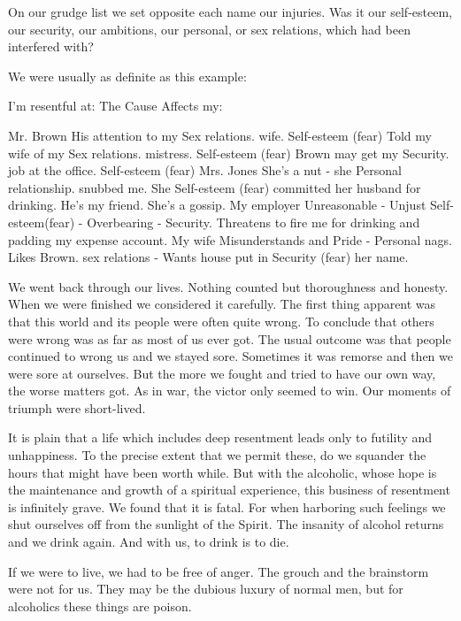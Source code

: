 \begin{biblechapter}
\verse On our grudge list we set opposite each name our injuries.
\verse Was it our 
    self-esteem, 
    our security, 
    our ambitions, 
    our personal, 
    or sex relations, 
    which had been interfered with?

\verse We were usually as definite as this example:

I'm resentful at:            The Cause                                    Affects my:

Mr. Brown 	His attention to my 	Sex relations.
 		wife. 	Self-esteem (fear) 
 	Told my wife of my 	Sex relations.
 		mistress. 	Self-esteem (fear)
 	Brown may get my  	Security.
 		job at the office. 	Self-esteem (fear)
Mrs. Jones 	She's a nut - she 	Personal relationship.
 		snubbed me. She 	Self-esteem (fear)
 		committed her husband 	
 		for drinking.
 		He's my friend.
 		She's a gossip.
My employer 	Unreasonable - Unjust 	Self-esteem(fear)
 		- Overbearing - 	Security.
 		Threatens to fire
 		me for drinking
 		and padding my expense
 		account.
My wife 	Misunderstands and 	Pride - Personal
 		nags. Likes Brown. 	sex  relations -
 		Wants house put in 	Security (fear)
 		her name.

\verse We went back through our lives.
\verse Nothing counted but thoroughness and honesty.
\verse When we were finished we considered it carefully.
\verse The first thing apparent was that this world 
    and its people were often quite wrong.
\verse To conclude that others were wrong was as far as most of us ever got.
\verse The usual outcome was that people continued to wrong us 
    and we stayed sore.
\verse Sometimes it was remorse 
    and then we were sore at ourselves.
\verse But the more we fought 
    and tried to have our own way, 
    the worse matters got.
\verse As in war, the victor only seemed to win.
\verse Our moments of triumph were short-lived.

\verse It is plain that a life which includes deep resentment 
    leads only to futility and unhappiness.
To the precise extent that we permit these, 
    do we squander the hours that might have been worth while.
But with the alcoholic, 
    whose hope is the maintenance and growth of a spiritual experience, 
    this business of resentment is infinitely grave.
We found that it is fatal.
For when harboring such feelings we shut ourselves off 
    from the sunlight of the Spirit.
The insanity of alcohol returns and we drink again.
And with us, to drink is to die.

\verse If we were to live, we had to be free of anger.
\verse The grouch and the brainstorm were not for us.
\verse They may be the dubious luxury of normal men, 
    but for alcoholics these things are poison.


\end{biblechapter}
